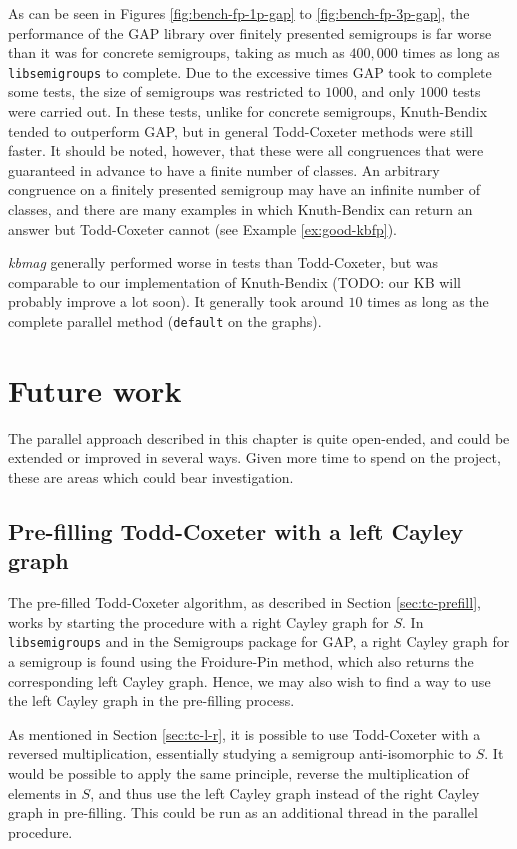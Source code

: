As can be seen in Figures \ref{fig:bench-fp-1p-gap} to \ref{fig:bench-fp-3p-gap}, the
performance of the GAP library over finitely presented semigroups is far worse
than it was for concrete semigroups, taking as much as $400,000$ times as long
as \texttt{libsemigroups} to complete.  Due to the excessive times GAP took to
complete some tests, the size of semigroups was restricted to $1000$, and only
$1000$ tests were carried out.  In these tests, unlike for concrete semigroups,
Knuth-Bendix tended to outperform GAP, but in
general Todd-Coxeter methods were still faster.  It should be noted, however,
that these were all congruences that were guaranteed in advance to have a finite
number of classes.  An arbitrary congruence on a finitely presented semigroup
may have an infinite number of classes, and there are many examples in which
Knuth-Bendix can return an answer but Todd-Coxeter cannot (see Example
\ref{ex:good-kbfp}).

\textit{kbmag} generally performed worse in tests than Todd-Coxeter, but was
comparable to our implementation of Knuth-Bendix (TODO: our KB will probably
improve a lot soon).  It generally took around $10$ times as long as the
complete parallel method (\texttt{default} on the graphs).

\section{Future work}

The parallel approach described in this chapter is quite open-ended, and could
be extended or improved in several ways.  Given more time to spend on the
project, these are areas which could bear investigation.

\subsection{Pre-filling Todd-Coxeter with a left Cayley graph}
\label{sec:prefill-left}
The pre-filled Todd-Coxeter algorithm, as described in Section
\ref{sec:tc-prefill}, works by starting the procedure with a right Cayley graph
for $S$.  In \texttt{libsemigroups} and in the Semigroups package for GAP, a
right Cayley graph for a semigroup is found using the Froidure-Pin method, which
also returns the corresponding left Cayley graph.  Hence, we may also wish to
find a way to use the left Cayley graph in the pre-filling process.

As mentioned in Section \ref{sec:tc-l-r}, it is possible to use Todd-Coxeter
with a reversed multiplication, essentially studying a semigroup anti-isomorphic
to $S$.  It would be possible to apply the same principle, reverse the
multiplication of elements in $S$, and thus use the left Cayley graph instead of
the right Cayley graph in pre-filling.  This could be run as an additional
thread in the parallel procedure.

